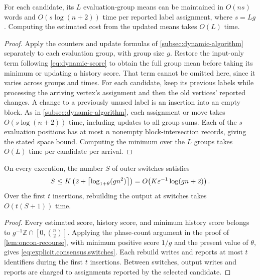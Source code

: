 \begin{lemma}\label{lem:explicit.cost.maintenance}
For each candidate, its $ L $ evaluation-group means can be maintained in $ O(ns) $ words and $ O(s\log(n+2)) $ time per reported label assignment, where $ s=Lg $.
Computing the estimated cost from the updated means takes $ O(L) $ time.
\end{lemma}
\begin{proof}
Apply the counters and update formulas of \cref{subsec:dynamic-algorithm} separately to each evaluation group, with group size $ g $.
Restore the input-only term following \eqref{eq:dynamic-score} to obtain the full group mean before taking its minimum or updating a history score.
That term cannot be omitted here, since it varies across groups and times.
For each candidate, keep its previous labels while processing the arriving vertex's assignment and then the old vertices' reported changes.
A change to a previously unused label is an insertion into an empty block.
As in \cref{subsec:dynamic-algorithm}, each assignment or move takes $ O(s\log(n+2)) $ time, including updates to all group sums.
Each of the $ s $ evaluation positions has at most $ n $ nonempty block-intersection records, giving the stated space bound.
Computing the minimum over the $ L $ groups takes $ O(L) $ time per candidate per arrival.
\end{proof}

\begin{lemma}\label{lem:explicit.rebuilding}
On every execution, the number $ S $ of outer switches satisfies
\begin{align}
    S\le K\left(2+\left\lceil\log_{1+\theta}(gn^2)\right\rceil\right)
    =O\!\left(K\varepsilon^{-1}\log(gn+2)\right).
    \label{eq:explicit.consensus.switches}
\end{align}
Over the first $ t $ insertions, rebuilding the output at switches takes $ O(t(S+1)) $ time.
\end{lemma}
\begin{proof}
Every estimated score, history score, and minimum history score belongs to $ g^{-1}\mathbb Z\cap[0,\binom n2] $.
Applying the phase-count argument in the proof of \cref{lem:oncon-recourse}, with minimum positive score $ 1/g $ and the present value of $ \theta $, gives \eqref{eq:explicit.consensus.switches}.
Each rebuild writes and reports at most $ t $ identifiers during the first $ t $ insertions.
Between switches, output writes and reports are charged to assignments reported by the selected candidate.
\end{proof}

